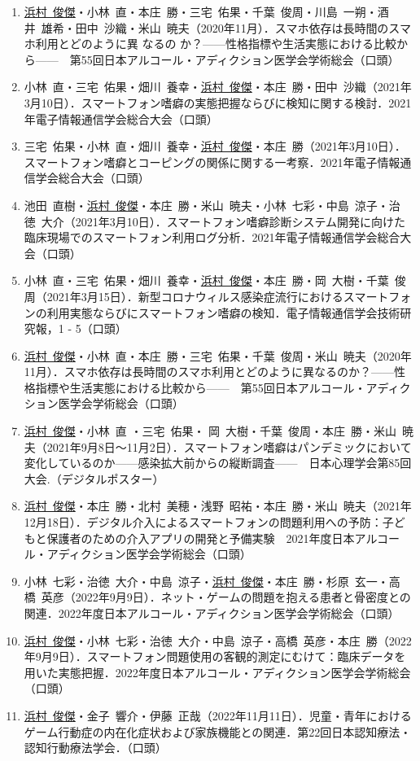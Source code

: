 \documentclass[11pt,a4paper]{article}
\begin{document}
\begin{enumerate}
	\item \underline{浜村\ 俊傑}・小林\ 直・本庄\ 勝・三宅\ 佑果・千葉\ 俊周・川島\ 一朔・酒井\ 雄希・田中\ 沙織・米山\ 暁夫（2020年11月）．スマホ依存は長時間のスマホ利用とどのように異	なるの	か？——性格指標や生活実態における比較から——　第55回日本アルコール・アディクション医学会学術総会（口頭）
	\item 小林\ 直・三宅\ 佑果・畑川\ 養幸・\underline{浜村\ 俊傑}・本庄\ 勝・田中\ 沙織（2021年3月10日）．スマートフォン嗜癖の実態把握ならびに検知に関する検討．2021年電子情報通信学会総合大会（口頭）
	\item 三宅\ 佑果・小林\ 直・畑川\ 養幸・\underline{浜村\ 俊傑}・本庄\ 勝（2021年3月10日）．スマートフォン嗜癖とコーピングの関係に関する一考察．2021年電子情報通信学会総合大会（口頭）
	\item 池田\ 直樹・\underline{浜村\ 俊傑}・本庄\ 勝・米山\ 暁夫・小林\ 七彩・中島\ 涼子・治徳\ 大介（2021年3月10日）．スマートフォン嗜癖診断システム開発に向けた臨床現場でのスマートフォン利用ログ分析．2021年電子情報通信学会総合大会（口頭）
	\item 小林\ 直・三宅\ 佑果・畑川\ 養幸・\underline{浜村\ 俊傑}・本庄\ 勝・岡\ 大樹・千葉\ 俊周（2021年3月15日）．新型コロナウィルス感染症流行におけるスマートフォンの利用実態ならびにスマートフォン嗜癖の検知．電子情報通信学会技術研究報，1 - 5（口頭）
	\item \underline{浜村\ 俊傑}・小林\ 直・本庄\ 勝・三宅\ 佑果・千葉\ 俊周・米山\ 暁夫（2020年11月）．スマホ依存は長時間のスマホ利用とどのように異なるのか？——性格指標や生活実態における比較から——　第55回日本アルコール・アディクション医学会学術総会（口頭）
	\item \underline{浜村\ 俊傑}・小林\ 直 ・三宅\ 佑果・ 岡\ 大樹・千葉\ 俊周・本庄\ 勝・米山\ 暁夫（2021年9月8日～11月2日）．スマートフォン嗜癖はパンデミックにおいて変化しているのか——感染拡大前からの縦断調査——　日本心理学会第85回大会.（デジタルポスター）
	\item \underline{浜村\ 俊傑}・本庄\ 勝・北村\ 美穂・浅野\ 昭祐・本庄\ 勝・米山\ 暁夫（2021年12月18日）．デジタル介入によるスマートフォンの問題利用への予防：子どもと保護者のための介入アプリの開発と予備実験　2021年度日本アルコール・アディクション医学会学術総会（口頭）
	\item 小林\ 七彩・治徳\ 大介・中島\ 涼子・\underline{浜村\ 俊傑}・本庄\ 勝・杉原\ 玄一・高橋\ 英彦（2022年9月9日）．ネット・ゲームの問題を抱える患者と骨密度との関連．2022年度日本アルコール・アディクション医学会学術総会（口頭）
	\item \underline{浜村\ 俊傑}・小林\ 七彩・治徳\ 大介・中島\ 涼子・高橋\ 英彦・本庄\ 勝（2022年9月9日）．スマートフォン問題使用の客観的測定にむけて：臨床データを用いた実態把握．2022年度日本アルコール・アディクション医学会学術総会（口頭）
	\item \underline{浜村\ 俊傑}・金子\ 響介・伊藤\ 正哉（2022年11月11日）．児童・青年におけるゲーム行動症の内在化症状および家族機能との関連．第22回日本認知療法・認知行動療法学会．（口頭）
\end{enumerate}
\end{document}

